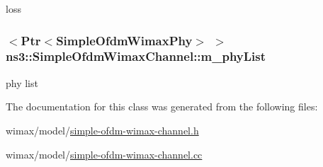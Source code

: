 loss 

\subsubsection[{\texorpdfstring{m\+\_\+phy\+List}{m_phyList}}]{$<${\bf Ptr}$<${\bf Simple\+Ofdm\+Wimax\+Phy}$>$ $>$ ns3\+::\+Simple\+Ofdm\+Wimax\+Channel\+::m\+\_\+phy\+List\hspace{0.3cm}{\ttfamily [private]}}\hypertarget{classns3_1_1SimpleOfdmWimaxChannel_a94f4604c10187d0242c0545275750cda}{}\label{classns3_1_1SimpleOfdmWimaxChannel_a94f4604c10187d0242c0545275750cda}


phy list 



The documentation for this class was generated from the following files\+:\begin{DoxyCompactItemize}
\item 
wimax/model/\hyperlink{simple-ofdm-wimax-channel_8h}{simple-\/ofdm-\/wimax-\/channel.\+h}\item 
wimax/model/\hyperlink{simple-ofdm-wimax-channel_8cc}{simple-\/ofdm-\/wimax-\/channel.\+cc}\end{DoxyCompactItemize}
